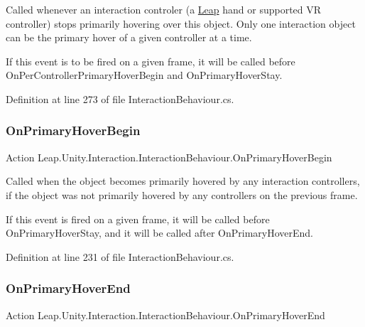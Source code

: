 Called whenever an interaction controler (a \mbox{\hyperlink{namespace_leap_1_1_unity_1_1_leap}{Leap}} hand or supported VR controller) stops primarily hovering over this object. Only one interaction object can be the primary hover of a given controller at a time. 

If this event is to be fired on a given frame, it will be called before On\+Per\+Controller\+Primary\+Hover\+Begin and On\+Primary\+Hover\+Stay. 

Definition at line 273 of file Interaction\+Behaviour.\+cs.

\mbox{\label{class_leap_1_1_unity_1_1_interaction_1_1_interaction_behaviour_aaeb5f857f9d3a44ea529c010e2ef1ac1}} 
\subsubsection{\texorpdfstring{OnPrimaryHoverBegin}{OnPrimaryHoverBegin}}
{\footnotesize\ttfamily Action Leap.\+Unity.\+Interaction.\+Interaction\+Behaviour.\+On\+Primary\+Hover\+Begin}



Called when the object becomes primarily hovered by any interaction controllers, if the object was not primarily hovered by any controllers on the previous frame. 

If this event is fired on a given frame, it will be called before On\+Primary\+Hover\+Stay, and it will be called after On\+Primary\+Hover\+End. 

Definition at line 231 of file Interaction\+Behaviour.\+cs.

\mbox{\label{class_leap_1_1_unity_1_1_interaction_1_1_interaction_behaviour_a9ac3f7f2d517f5a5deaa87ab34954bb4}} 
\subsubsection{\texorpdfstring{OnPrimaryHoverEnd}{OnPrimaryHoverEnd}}
{\footnotesize\ttfamily Action Leap.\+Unity.\+Interaction.\+Interaction\+Behaviour.\+On\+Primary\+Hover\+End}



